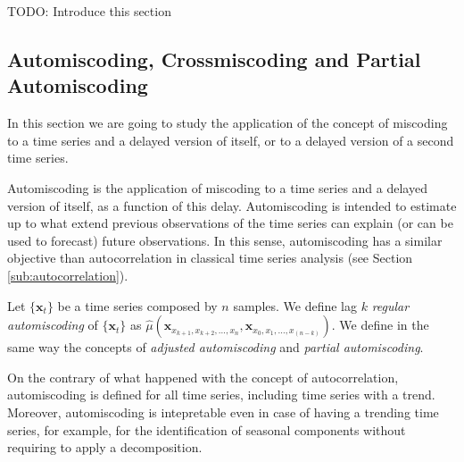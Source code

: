 {\color{red} TODO: Introduce this section}


\subsection{Automiscoding, Crossmiscoding and Partial Automiscoding}

In this section we are going to study the application of the concept of miscoding to a time series and a delayed version of itself, or to a delayed version of a second time series.

Automiscoding is the application of miscoding to a time series and a delayed version of itself, as a function of this delay. Automiscoding is intended to estimate up to what extend previous observations of the time series can explain (or can be used to forecast) future observations. In this sense, automiscoding has a similar objective than autocorrelation in classical time series analysis (see Section \ref{sub:autocorrelation}).

\begin{definition}
Let $\{\mathbf{x}_t\}$ be a time series composed by $n$ samples. We define lag $k$ \emph{regular automiscoding} of $\{\mathbf{x}_t\}$ as $\hat\mu(\mathbf{x}_{x_{k+1}, x_{k+2}, \ldots, x_n}, \mathbf{x}_{x_0, x_1, \ldots, x_{(n-k)}})$. We define in the same way the concepts of \emph{adjusted automiscoding} and \emph{partial automiscoding}.
\end{definition}

On the contrary of what happened with the concept of autocorrelation, automiscoding is defined for all time series, including time series with a trend. Moreover, automiscoding is intepretable even in case of having a trending time series, for example, for the identification of seasonal components without requiring to apply a decomposition.

